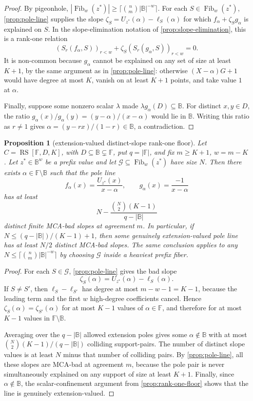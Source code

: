 \documentclass[a4paper,11pt]{amsart}
\newtheorem{proposition}[proposition]{Proposition}
\theoremstyle{remark}
\newcommand{\F}{\mathbb F}
\newcommand{\B}{\mathbb B}
\newcommand{\RS}{\operatorname{RS}}
\newcommand{\Fib}{\operatorname{Fib}}
\begin{document}
\begin{proof}
By pigeonhole, \(|\Fib_w(z^*)|\ge\lceil\binom nm|\B|^{-w}\rceil\).  For each \(S\in\Fib_w(z^*)\), \cref{prop:pole-line} supplies the slope \(\zeta_S=U_{z^*}(\alpha)-\ell_S(\alpha)\) for which \(f_\alpha+\zeta_S g_\alpha\) is explained on \(S\).  In the slope-elimination notation of \cref{prop:slope-elimination}, this is a rank-one relation
\[
        (S_r(f_\alpha,S))_{r<w}+\zeta_S(S_r(g_\alpha,S))_{r<w}=0 .
\]
It is non-common because \(g_\alpha\) cannot be explained on any set of size at least \(K+1\), by the same argument as in \cref{prop:pole-line}: otherwise \((X-\alpha)G+1\) would have degree at most \(K\), vanish on at least \(K+1\) points, and take value \(1\) at \(\alpha\).

Finally, suppose some nonzero scalar \(\lambda\) made \(\lambda g_\alpha(D)\subseteq\B\).  For distinct \(x,y\in D\), the ratio \(g_\alpha(x)/g_\alpha(y)=(y-\alpha)/(x-\alpha)\) would lie in \(\B\).  Writing this ratio as \(r\ne1\) gives \(\alpha=(y-rx)/(1-r)\in\B\), a contradiction.
\end{proof}

\begin{proposition}[extension-valued distinct-slope rank-one floor]\label{prop:rank-one-distinct-slope-floor}
Let \(C=\RS[\F,D,K]\), with \(D\subseteq\B\subsetneq\F\), put \(q=|\F|\), and fix \(m\ge K+1\), \(w=m-K\).  Let \(z^*\in\B^w\) be a prefix value and let \(\mathcal G\subseteq\Fib_w(z^*)\) have size \(N\).  Then there exists \(\alpha\in\F\setminus\B\) such that the pole line
\[
        f_\alpha(x)=\frac{U_{z^*}(x)}{x-\alpha},
        \qquad
        g_\alpha(x)=\frac{-1}{x-\alpha}
\]
has at least
\[
        N-\frac{\binom N2 (K-1)}{q-|\B|}
\]
distinct finite MCA-bad slopes at agreement \(m\).  In particular, if \(N\le(q-|\B|)/(K-1)+1\), then some genuinely extension-valued pole line has at least \(N/2\) distinct MCA-bad slopes.  The same conclusion applies to any \(N\le\lceil\binom nm|\B|^{-w}\rceil\) by choosing \(\mathcal G\) inside a heaviest prefix fiber.
\end{proposition}

\begin{proof}
For each \(S\in\mathcal G\), \cref{prop:pole-line} gives the bad slope
\[
        \zeta_S(\alpha)=U_{z^*}(\alpha)-\ell_S(\alpha).
\]
If \(S\ne S'\), then \(\ell_S-\ell_{S'}\) has degree at most \(m-w-1=K-1\), because the leading term and the first \(w\) high-degree coefficients cancel.  Hence \(\zeta_S(\alpha)=\zeta_{S'}(\alpha)\) for at most \(K-1\) values of \(\alpha\in\F\), and therefore for at most \(K-1\) values in \(\F\setminus\B\).

Averaging over the \(q-|\B|\) allowed extension poles gives some \(\alpha\notin\B\) with at most \(\binom N2(K-1)/(q-|\B|)\) colliding support-pairs.  The number of distinct slope values is at least \(N\) minus that number of colliding pairs.  By \cref{prop:pole-line}, all these slopes are MCA-bad at agreement \(m\), because the pole pair is never simultaneously explained on any support of size at least \(K+1\).  Finally, since \(\alpha\notin\B\), the scalar-confinement argument from \cref{prop:rank-one-floor} shows that the line is genuinely extension-valued.
\end{proof}
\end{document}
